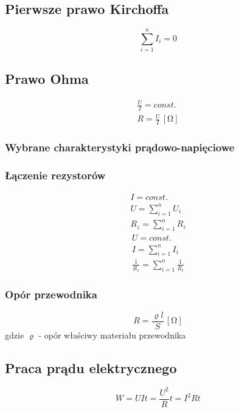 \documentclass{article}
\numberwithin{equation}{section}
\newcommand{\unit}[1]{\, \left[\mathrm{#1}\right]}
\begin{document}
    \subsection{Pierwsze prawo Kirchoffa}
      \begin{equation}
        \sum_{i=1}^n I_i = 0
      \end{equation}
    \subsection{Prawo Ohma}
      \begin{gather}
        \frac{U}{I} = const.\\
        R = \frac{U}{I} \unit{\Omega}
      \end{gather}
      \subsubsection{Wybrane charakterystyki prądowo-napięciowe}
      \subsubsection{Łączenie rezystorów}
        \begin{gather}
          I = const.\\
          U = \sum_{i=1}^n U_i\\
          R_z = \sum_{i=1}^n R_i
        \end{gather}
        \begin{gather}
          U = const.\\
          I = \sum_{i=1}^n I_i\\
          \frac{1}{R_z} = \sum_{i=1}^n \frac{1}{R_i}
        \end{gather}
      \subsubsection{Opór przewodnika}
        \begin{equation}
          R = \frac{\varrho l}{S} \unit{\Omega}
        \end{equation}
      gdzie $\varrho$ - opór właściwy materiału przewodnika
    \subsection{Praca prądu elektrycznego}
      \begin{equation}
        W = UIt = \frac{U^2}{R}t = I^2Rt
      \end{equation}
\end{document}
